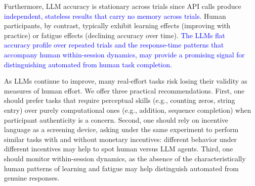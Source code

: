 \documentclass[12pt,a4paper]{article}
\newcommand{\blue}[1]{\textcolor{blue}{#1}}
\begin{document}

Furthermore,
LLM accuracy is stationary across trials
since API calls produce \blue{independent, stateless results that carry no memory across trials}. Human participants, by contrast, typically exhibit learning effects (improving with practice) or fatigue effects (declining accuracy over time). \blue{The LLMs flat accuracy profile over repeated trials and the response-time patterns that accompany human within-session dynamics, may provide a promising signal for distinguishing automated from human task completion.}

As LLMs continue to improve, many real-effort tasks risk losing their validity as measures of human effort. We offer three practical recommendations. 
First, one should prefer tasks that require perceptual skills (e.g., counting zeros, string entry) over purely computational ones (e.g., addition, sequence completion) when participant authenticity is a concern.
Second, one should rely on incentive language as a screening device, asking under the same experiment to perform similar tasks with and without monetary incentives: different behavior under different incentives may help to spot human versus LLM
agents.
Third, one should monitor within-session dynamics,
as the absence of the characteristically human patterns of learning and fatigue may help distinguish automated from genuine responses.
\end{document}
